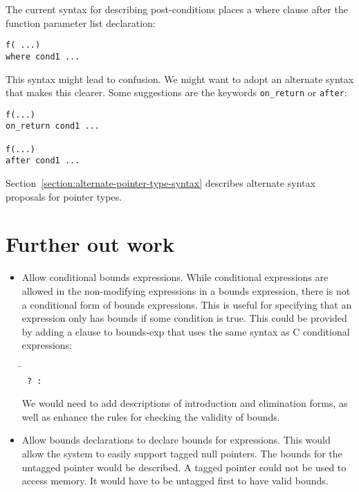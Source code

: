 The current syntax for describing post-conditions places a where clause
after the function parameter list declaration:

\begin{verbatim}
f( ...)
where cond1 ...
\end{verbatim}

This syntax might lead to confusion. We might want to adopt an alternate
syntax that makes this clearer. Some suggestions are the keywords
\texttt{on\_return} or \texttt{after}:

\begin{verbatim}
f(...)
on_return cond1 ...

f(...)
after cond1 ...
\end{verbatim}

Section~\ref{section:alternate-pointer-type-syntax} describes alternate
syntax proposals for pointer types.

\section{Further out work}
\begin{itemize}
\item Allow conditional bounds expressions.   While conditional
expressions are allowed in the non-modifying expressions in a bounds expression, 
there is not a conditional form of bounds expressions.  This is useful for
specifying that an expression only has bounds if some condition is true.
This could be provided by adding a clause to bounds-exp that uses the
same syntax as C conditional expressions:
\begin{tabbing}
\= \\
\>\texttt{ ?  : }
\end{tabbing}

We would need to add descriptions of introduction and elimination
forms, as well as enhance the rules for checking the validity of bounds.

\item Allow bounds declarations to declare bounds for expressions.
This would allow the system to easily support tagged null pointers.
The bounds for the untagged pointer would be described. 
A tagged pointer could not be used to access memory.  It would have to be
untagged first  to have valid bounds.
\end{itemize}

